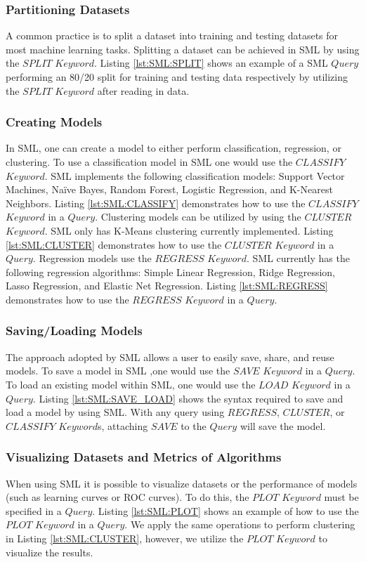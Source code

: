 \subsubsection{Partitioning Datasets}
A common practice is to split a dataset into training and testing datasets for most machine learning tasks.  Splitting a dataset can be achieved in SML by using the \(SPLIT\) \(Keyword\).  Listing \ref{lst:SML:SPLIT} shows an example of a SML \(Query\) performing an 80/20 split for training and testing data respectively by utilizing the \(SPLIT\) \(Keyword\) after reading in data.

\subsubsection{Creating Models}

In SML,  one can create a model to either perform classification, regression, or clustering. To use a classification model in SML one would use the \(CLASSIFY\) \(Keyword\). SML implements the following classification models: Support Vector Machines, Na\"ive Bayes, Random Forest, Logistic Regression, and K-Nearest Neighbors.  Listing \ref{lst:SML:CLASSIFY} demonstrates how to use the \(CLASSIFY\) \(Keyword\) in a \(Query\).  Clustering models can be utilized by using the \(CLUSTER\) \(Keyword\).  SML  only has K-Means clustering currently implemented.  Listing \ref{lst:SML:CLUSTER} demonstrates how to use the \(CLUSTER\) \(Keyword\) in a \(Query\).  Regression models use the \(REGRESS\) \(Keyword\).  SML currently has the following regression algorithms: Simple Linear Regression, Ridge Regression, Lasso Regression, and Elastic Net Regression. Listing \ref{lst:SML:REGRESS} demonstrates how to use the \(REGRESS\) \(Keyword\) in a \(Query\).


\subsubsection{Saving/Loading Models}
The approach adopted by SML allows a user to easily save, share, and reuse models. To save a model in SML ,one would use the \(SAVE\) \(Keyword\) in a \(Query\). To load an existing model within SML, one would use the \(LOAD\) \(Keyword\) in a \(Query\).  Listing \ref{lst:SML:SAVE_LOAD} shows the syntax required to save and load a model by using SML.  With any query using \(REGRESS\),  \(CLUSTER\),  or \(CLASSIFY\) \(Keyword\)s,  attaching \(SAVE\) to the \(Query\) will save the model. 

\subsubsection{Visualizing Datasets and Metrics of Algorithms}
When using SML it is possible to visualize datasets or the performance of models (such as learning curves or ROC curves).  To do this, the \(PLOT\) \(Keyword\) must be specified in a \(Query\).  Listing \ref{lst:SML:PLOT} shows an example of how to use the \(PLOT\) \(Keyword\) in a \(Query\).  We apply the same operations to perform clustering in Listing \ref{lst:SML:CLUSTER}, however, we utilize the \(PLOT\) \(Keyword\) to visualize the results.

